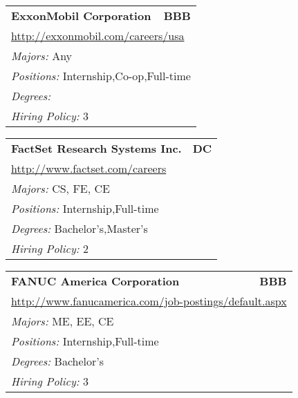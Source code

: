 \documentclass[twoside]{article}
\begin{document}
\begin{center}
\begin{multicols}{3}
\begin{FlushLeft}
\begin{minipage}{.9\columnwidth}
\end{minipage}
 
\begin{minipage}{.9\columnwidth}\begin{tabularx}{.95\columnwidth}{Xr}
                 {\Large\bf ExxonMobil Corporation} & {\Large\bf BBB}\\
    \multicolumn{2}{p{.95\columnwidth}}{\url{http://exxonmobil.com/careers/usa}}\\
    \multicolumn{2}{p{.95\columnwidth}}{\emph{Majors:} Any}\\
    \multicolumn{2}{p{.95\columnwidth}}{\emph{Positions:} Internship,Co-op,Full-time}\\
    \multicolumn{2}{p{.95\columnwidth}}{\emph{Degrees:} }\\
    \multicolumn{2}{p{.95\columnwidth}}{\emph{Hiring Policy:} 3}\\
    \end{tabularx}
    
\end{minipage}
 
\begin{minipage}{.9\columnwidth}\begin{tabularx}{.95\columnwidth}{Xr}
                 {\Large\bf FactSet Research Systems Inc.} & {\Large\bf DC}\\
    \multicolumn{2}{p{.95\columnwidth}}{\url{http://www.factset.com/careers}}\\
    \multicolumn{2}{p{.95\columnwidth}}{\emph{Majors:} CS, FE, CE}\\
    \multicolumn{2}{p{.95\columnwidth}}{\emph{Positions:} Internship,Full-time}\\
    \multicolumn{2}{p{.95\columnwidth}}{\emph{Degrees:} Bachelor's,Master's}\\
    \multicolumn{2}{p{.95\columnwidth}}{\emph{Hiring Policy:} 2}\\
    \end{tabularx}
    
\end{minipage}
 
\begin{minipage}{.9\columnwidth}\begin{tabularx}{.95\columnwidth}{Xr}
                 {\Large\bf FANUC America Corporation} & {\Large\bf BBB}\\
    \multicolumn{2}{p{.95\columnwidth}}{\url{http://www.fanucamerica.com/job-postings/default.aspx}}\\
    \multicolumn{2}{p{.95\columnwidth}}{\emph{Majors:} ME, EE, CE}\\
    \multicolumn{2}{p{.95\columnwidth}}{\emph{Positions:} Internship,Full-time}\\
    \multicolumn{2}{p{.95\columnwidth}}{\emph{Degrees:} Bachelor's}\\
    \multicolumn{2}{p{.95\columnwidth}}{\emph{Hiring Policy:} 3}\\
    \end{tabularx}
    

\end{minipage}
\end{FlushLeft}
\end{multicols}
\end{center}
\end{document}
